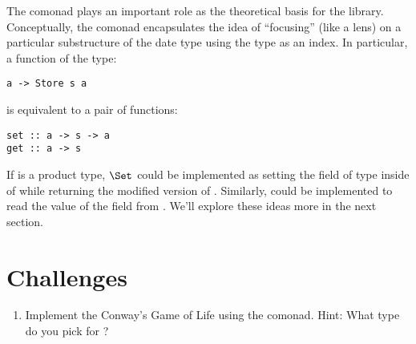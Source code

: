 The  comonad plays an important role as the theoretical
basis for the  library. Conceptually, the
 comonad encapsulates the idea of ``focusing'' (like
a lens) on a particular substructure of the date type  using
the type  as an index. In particular, a function of the type:

\begin{Verbatim}
a -> Store s a
\end{Verbatim}
is equivalent to a pair of functions:

\begin{Verbatim}
set :: a -> s -> a
get :: a -> s
\end{Verbatim}
If  is a product type, $\Set$ could be implemented as
setting the field of type  inside of  while
returning the modified version of . Similarly, 
could be implemented to read the value of the  field from
. We'll explore these ideas more in the next section.

\section{Challenges}

\begin{enumerate}
\tightlist
\item
  Implement the Conway's Game of Life using the  comonad.
  Hint: What type do you pick for ?
\end{enumerate}
